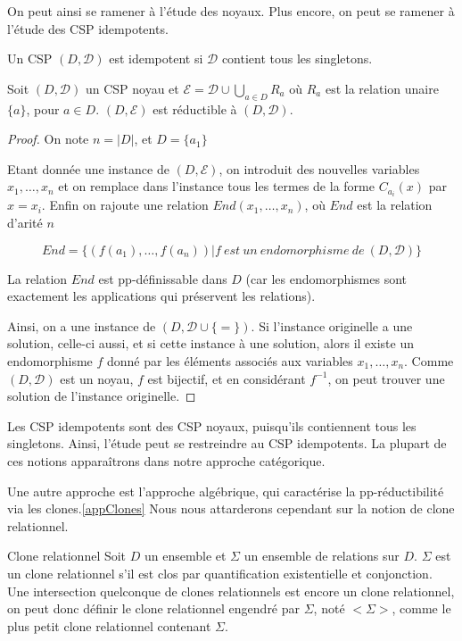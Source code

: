 On peut ainsi se ramener à l'étude des noyaux. Plus encore, on peut se ramener
à l'étude des CSP idempotents.

\begin{defi}{}
Un CSP $(D,\mathcal{D})$ est idempotent si $\mathcal{D}$ contient tous les singletons.
\end{defi}

\begin{theo}{}
    Soit $(D,\mathcal{D})$ un CSP noyau et $\mathcal{E} = \mathcal{D} \cup
    \bigcup_{a \in D} R_a$ où $R_a$ est la relation unaire $\{a\}$, pour $a \in
    D$. $(D,\mathcal{E})$ est réductible à $(D,\mathcal{D})$.
\end{theo}

\begin{proof}
    On note $n=|D| $, et $D=\{a_1\}$

    Etant donnée une instance de $(D,\mathcal{E})$, on introduit des nouvelles
    variables $x_1,\dots,x_n$ et on remplace dans l'instance tous les termes de
    la forme $C_{a_i}(x)$ par $x=x_i$. Enfin on rajoute une relation
    $End(x_1,\dots,x_n)$, où $End$ est la relation d'arité $n$ 

    $$ End = \{(f(a_1),\dots,f(a_n))| f\ est\ un\ endomorphisme\ de\
    (D,\mathcal{D})\}$$

    La relation $End$ est pp-définissable dans $D$ (car les endomorphismes sont
    exactement les applications qui préservent les relations). 

    Ainsi, on a une instance de $(D,\mathcal{D} \cup \{=\})$. Si l'instance
    originelle a une solution, celle-ci aussi, et si cette instance à une
    solution, alors il existe un endomorphisme $f$ donné par les éléments
    associés aux variables $x_1,\dots,x_n$. Comme $(D,\mathcal{D})$ est un
    noyau, $f$ est bijectif, et en considérant $f^{-1}$, on peut trouver une
    solution de l'instance originelle.
\end{proof}

Les CSP idempotents sont des CSP noyaux, puisqu'ils contiennent tous les
singletons. Ainsi, l'étude peut se restreindre au CSP idempotents. La plupart
de ces notions apparaîtrons dans notre approche catégorique.

Une autre approche est l'approche algébrique, qui caractérise la
pp-réductibilité via les clones.\ref{appClones} Nous nous attarderons
cependant sur la notion de clone relationnel.

\begin{defi}{Clone relationnel}
    Soit $D$ un ensemble et $\Sigma$ un ensemble de relations sur $D$. $\Sigma$ est
    un clone relationnel s'il est clos par quantification existentielle et
    conjonction.  Une intersection quelconque de clones relationnels est encore
    un clone relationnel, on peut donc définir le clone relationnel engendré
    par $\Sigma$, noté $<\Sigma>$, comme le plus petit clone relationnel
    contenant $\Sigma$.
\end{defi}

